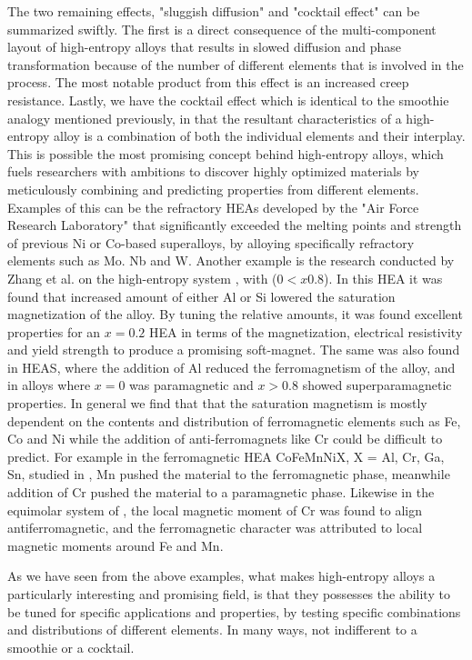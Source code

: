 The two remaining effects, "sluggish diffusion" and "cocktail effect" can be summarized swiftly. The first is a direct consequence of the multi-component layout of high-entropy alloys that results in slowed diffusion and phase transformation because of the number of different elements that is involved in the process. The most notable product from this effect is an increased creep resistance. Lastly, we have the cocktail effect which is identical to the smoothie analogy mentioned previously, in that the resultant characteristics of a high-entropy alloy is a combination of both the individual elements and their interplay. This is possible the most promising concept behind high-entropy alloys, which fuels researchers with ambitions to discover highly optimized materials by meticulously combining and predicting properties from different elements. Examples of this can be the refractory HEAs developed by the "Air Force Research Laboratory" that significantly exceeded the melting points and strength of previous Ni or Co-based superalloys, by alloying specifically refractory elements such as Mo. Nb and W. Another example is the research conducted by Zhang et al. on the high-entropy system , with ($0 < x 0.8$). In this HEA it was found that increased amount of either Al or Si lowered the saturation magnetization of the alloy. By tuning the relative amounts, it was found excellent properties for an $x=0.2$ HEA in terms of the magnetization, electrical resistivity and yield strength to produce a promising soft-magnet. The same was also found in  HEAS, where the addition of Al reduced the ferromagnetism of the alloy, and in  alloys where $x = 0$ was paramagnetic and $x > 0.8$ showed superparamagnetic properties. In general we find that that the saturation magnetism is mostly dependent on the contents and distribution of ferromagnetic elements such as Fe, Co and Ni while the addition of anti-ferromagnets like Cr could be difficult to predict. For example in the ferromagnetic HEA CoFeMnNiX, X = Al, Cr, Ga, Sn, studied in \cite{ZUO201710}, Mn pushed the material to the ferromagnetic phase, meanwhile addition of Cr pushed the material to a paramagnetic phase. Likewise in the equimolar system of  \cite{PhysRevB.96.014437}, the local magnetic moment of Cr was found to align antiferromagnetic, and the ferromagnetic character was attributed to local magnetic moments around Fe and Mn. 

As we have seen from the above examples, what makes high-entropy alloys a particularly interesting and promising field, is that they possesses the ability to be tuned for specific applications and properties, by testing specific combinations and distributions of different elements. In many ways, not indifferent to a smoothie or a cocktail.